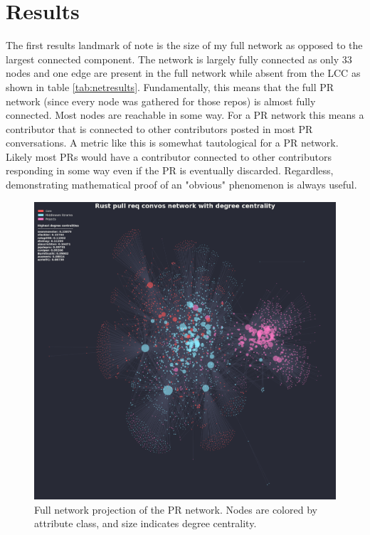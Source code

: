 \documentclass[12pt, a4paper]{article}
\begin{document}
\section{Results}
The first results landmark of note is the size of my full network as opposed to the largest connected component. The network is largely fully connected as only 33 nodes and one edge are present in the full network while absent from the LCC as shown in table \ref{tab:netresults}. Fundamentally, this means that the full PR network (since every node was gathered for those repos) is almost fully connected. Most nodes are reachable in some way. For a PR network this means a contributor that is connected to other contributors posted in most PR conversations. A metric like this is somewhat tautological for a PR network. Likely most PRs would have a contributor connected to other contributors responding in some way even if the PR is eventually discarded. Regardless, demonstrating mathematical proof of an "obvious" phenomenon is always useful.

\begin{figure}
    \includegraphics[width=\linewidth]{network_full_degcent.png}
    \caption{Full network projection of the PR network. Nodes are colored by attribute class, and size indicates degree centrality.}
    \label{fig:fullnet}
\end{figure}
\end{document}
